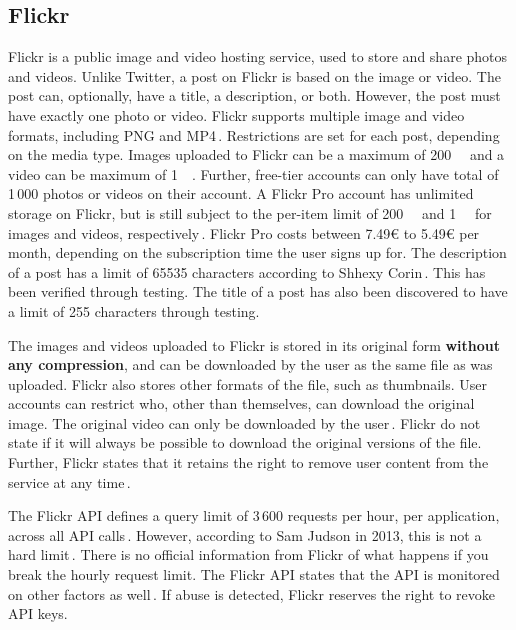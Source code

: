 \subsection{Flickr}
\label{subsec:ows_flickr}
Flickr is a public image and video hosting service, used to store and share photos and videos. Unlike Twitter, a post on Flickr is based on the image or video. The post can, optionally, have a title, a description, or both. However, the post must have exactly one photo or video. Flickr supports multiple image and video formats, including PNG and MP4\,\cite{FlickrUploadRequirements2022}. Restrictions are set for each post, depending on the media type. Images uploaded to Flickr can be a maximum of \SI{200}{\mega\byte} and a video can be maximum of \SI{1}{\giga\byte}. Further, free-tier accounts can only have total of 1\,000 photos or videos on their account. A Flickr Pro account has unlimited storage on Flickr, but is still subject to the per-item limit of \SI{200}{\mega\byte} and \SI{1}{\giga\byte} for images and videos, respectively\,\cite{flickrinc.UpgradeEverythingYou}. Flickr Pro costs between 7.49€ to 5.49€ per month, depending on the subscription time the user signs up for. The description of a post has a limit of 65535 characters according to Shhexy Corin\,\cite{FlickrHelpForum2009}. This has been verified through testing. The title of a post has also been discovered to have a limit of 255 characters through testing.

The images and videos uploaded to Flickr is stored in its original form \textbf{without any compression}, and can be downloaded by the user as the same file as was uploaded\cite{flickrinc.DownloadPermissions}. Flickr also stores other formats of the file, such as thumbnails. User accounts can restrict who, other than themselves, can download the original image. The original video can only be downloaded by the user\,\cite{flickrinc.DownloadPermissions}. Flickr do not state if it will always be possible to download the original versions of the file. Further, Flickr states that it retains the right to remove user content from the service at any time\,\cite{flickrinc.FlickrTermsConditions2020}.

The Flickr API defines a query limit of 3\,600 requests per hour, per application, across all API calls\,\cite{flickrinc.FlickrFlickrDeveloper}. However, according to Sam Judson in 2013, this is not a hard limit\,\cite{WhatAreAPI2013}. There is no official information from Flickr of what happens if you break the hourly request limit. The Flickr API states that the API is monitored on other factors as well\,\cite{flickrinc.FlickrFlickrDeveloper}. If abuse is detected, Flickr reserves the right to revoke API keys.